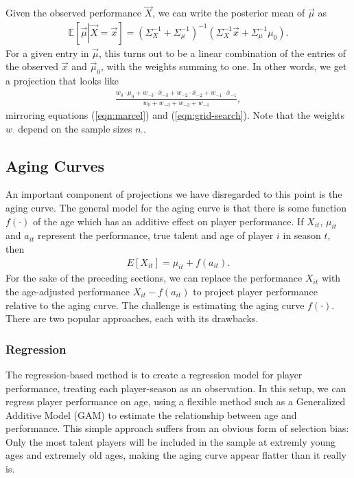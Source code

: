 \documentclass{article}
\begin{document}
    Given the observed performance $\vec X$, we can write the posterior mean of $\vec\mu$ as
    \begin{align*}
      \mathbb{E}\left[\vec\mu \left| \vec X = \vec x\right.\right] = \left(\Sigma_X^{-1} + \Sigma_\mu^{-1}\right)^{-1}\left(\Sigma_X^{-1}\vec x + \Sigma_\mu^{-1}\mu_0\right).
    \end{align*}
    For a given entry in $\vec\mu$, this turns out to be a linear combination of the entries of the observed $\vec x$ and $\vec\mu_0$, with the weights summing to one. In other words, we get a projection that looks like
    \begin{align*}
      \label{eqn:mvn-posterior}
      \frac
        {w_0 \cdot \mu_0 + w_{-3} \cdot \bar x_{-3} + w_{-2} \cdot \bar x_{-2} + w_{-1} \cdot \bar x_{-1}}
        {w_0 + w_{-3} + w_{-2} + w_{-1}},
    \end{align*}
    mirroring equations (\ref{eqn:marcel}) and (\ref{eqn:grid-search}). Note that the weights $w_\cdot$ depend on the sample sizes $n_\cdot$.

  \subsection{\sc Aging Curves}

    An important component of projections we have disregarded to this point is the aging curve. The general model for the aging curve is that there is some function $f(\cdot)$ of the age which has an additive effect on player performance. If $X_{it}$, $\mu_{it}$ and $a_{it}$ represent the performance, true talent and age of player $i$ in season $t$, then
    \begin{align*}
      E[X_{it}] = \mu_{it} + f(a_{it}).
    \end{align*}
    For the sake of the preceding sections, we can replace the performance $X_{it}$ with the age-adjusted performance $X_{it} - f(a_{it})$ to project player performance relative to the aging curve. The challenge is estimating the aging curve $f(\cdot)$. There are two popular approaches, each with its drawbacks.

    \subsubsection{\sc Regression}

      The regression-based method is to create a regression model for player performance, treating each player-season as an observation. In this setup, we can regress player performance on age, using a flexible method such as a Generalized Additive Model (GAM) to estimate the relationship between age and performance. This simple approach suffers from an obvious form of selection bias: Only the most talent players will be included in the sample at extremly young ages and extremely old ages, making the aging curve appear flatter than it really is.
\end{document}
